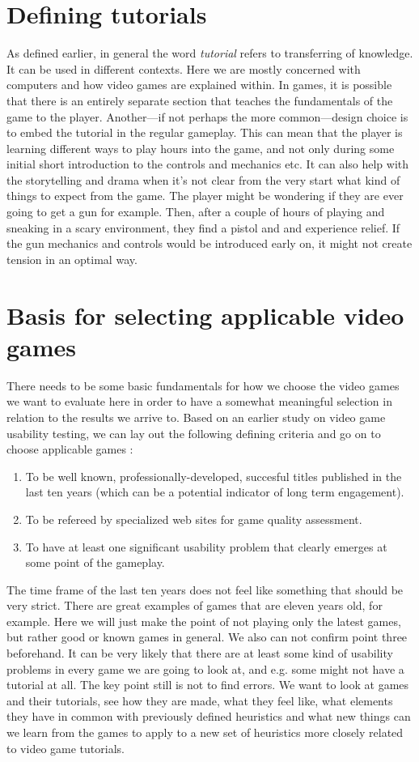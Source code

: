 \section{Defining tutorials}
As defined earlier, in general the word \textit{tutorial} refers to transferring of knowledge. It can be used in different contexts. Here we are mostly concerned with computers and how video games are explained within. In games, it is possible that there is an entirely separate section that teaches the fundamentals of the game to the player. Another---if not perhaps the more common---design choice is to embed the tutorial in the regular gameplay. This can mean that the player is learning different ways to play hours into the game, and not only during some initial short introduction to the controls and mechanics etc. It can also help with the storytelling and drama when it's not clear from the very start what kind of things to expect from the game. The player might be wondering if they are ever going to get a gun for example. Then, after a couple of hours of playing and sneaking in a scary environment, they find a pistol and and experience relief. If the gun mechanics and controls would be introduced early on, it might not create tension in an optimal way.

\section{Basis for selecting applicable video games}
There needs to be some basic fundamentals for how we choose the video games we want to evaluate here in order to have a somewhat meaningful selection in relation to the results we arrive to. Based on an earlier study on video game usability testing, we can lay out the following defining criteria and go on to choose applicable games \cite{Febretti2009a}:
\begin{enumerate}
	\item To be well known, professionally-developed, succesful titles published in the last ten years (which can be a potential indicator of long term engagement).
	\item To be refereed by specialized web sites for game quality assessment.
	\item To have at least one significant usability problem that clearly emerges at some point of the gameplay.
\end{enumerate}

The time frame of the last ten years does not feel like something that should be very strict. There are great examples of games that are eleven years old, for example. Here we will just make the point of not playing only the latest games, but rather good or known games in general. We also can not confirm point three beforehand. It can be very likely that there are at least some kind of usability problems in every game we are going to look at, and e.g. some might not have a tutorial at all. The key point still is not to find errors. We want to look at games and their tutorials, see how they are made, what they feel like, what elements they have in common with previously defined heuristics and what new things can we learn from the games to apply to a new set of heuristics more closely related to video game tutorials.